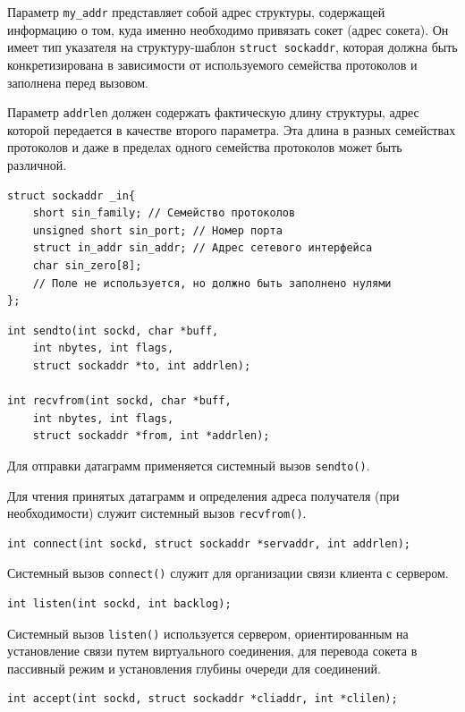 \documentclass[a4paper,14pt]{extarticle}
\begin{document}
Параметр \verb|my_addr| представляет собой адрес структуры, содержащей информацию о том, куда именно необходимо привязать сокет (адрес сокета). Он имеет тип указателя на структуру-шаблон \verb|struct sockaddr|, которая должна быть конкретизирована в зависимости от используемого семейства протоколов и заполнена перед вызовом.

Параметр \verb|addrlen| должен содержать фактическую длину структуры, адрес которой передается в качестве второго параметра. Эта длина в разных семействах протоколов и даже в пределах одного семейства протоколов может быть различной.

\begin{verbatim}
struct sockaddr _in{
    short sin_family; // Семейство протоколов
    unsigned short sin_port; // Номер порта
    struct in_addr sin_addr; // Адрес сетевого интерфейса
    char sin_zero[8]; 
    // Поле не используется, но должно быть заполнено нулями
};
\end{verbatim}
\newpage
\begin{verbatim}
int sendto(int sockd, char *buff, 
    int nbytes, int flags, 
    struct sockaddr *to, int addrlen);
    
int recvfrom(int sockd, char *buff, 
    int nbytes, int flags, 
    struct sockaddr *from, int *addrlen);
\end{verbatim}

Для отправки датаграмм применяется системный вызов \verb|sendto()|.

Для чтения принятых датаграмм и определения адреса получателя (при необходимости) служит системный вызов \verb|recvfrom()|.

\begin{verbatim}
int connect(int sockd, struct sockaddr *servaddr, int addrlen);
\end{verbatim}

Системный вызов \verb|connect()| служит для организации связи клиента с сервером.

\begin{verbatim}
int listen(int sockd, int backlog);
\end{verbatim}

Системный вызов \verb|listen()| используется сервером, ориентированным на установление связи путем виртуального соединения, для перевода сокета в пассивный режим и установления глубины очереди для соединений.

\begin{verbatim}
int accept(int sockd, struct sockaddr *cliaddr, int *clilen);
\end{verbatim}
\end{document}
